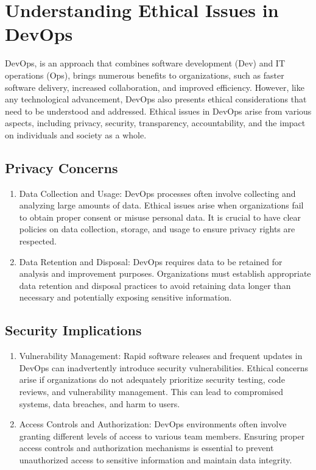 \chapter{Understanding Ethical Issues in DevOps}

DevOps, is an approach that combines software development (Dev) and IT operations (Ops), brings numerous benefits to organizations, such as faster software delivery, increased collaboration, and improved efficiency. However, like any technological advancement, DevOps also presents ethical considerations that need to be understood and addressed. Ethical issues in DevOps arise from various aspects, including privacy, security, transparency, accountability, and the impact on individuals and society as a whole.

\section*{Privacy Concerns}
\begin{enumerate}
    \item Data Collection and Usage: DevOps processes often involve collecting and analyzing large amounts of data. Ethical issues arise when organizations fail to obtain proper consent or misuse personal data. It is crucial to have clear policies on data collection, storage, and usage to ensure privacy rights are respected.

    \item Data Retention and Disposal: DevOps requires data to be retained for analysis and improvement purposes. Organizations must establish appropriate data retention and disposal practices to avoid retaining data longer than necessary and potentially exposing sensitive information.
\end{enumerate}

\section*{Security Implications}
\begin{enumerate}
    \item Vulnerability Management: Rapid software releases and frequent updates in DevOps can inadvertently introduce security vulnerabilities. Ethical concerns arise if organizations do not adequately prioritize security testing, code reviews, and vulnerability management. This can lead to compromised systems, data breaches, and harm to users.

    \item Access Controls and Authorization: DevOps environments often involve granting different levels of access to various team members. Ensuring proper access controls and authorization mechanisms is essential to prevent unauthorized access to sensitive information and maintain data integrity.
\end{enumerate}

